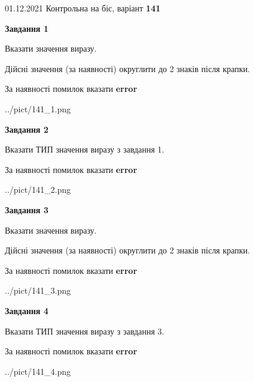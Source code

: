\documentclass[11pt, ukrainian]{article}
\begin{document}
{01.12.2021 Контрольна на біс, варіант  \No \textbf { 141 }\par}
{
\begin {large}
{\begin {center}\textbf{Завдання 1}\end {center}}\par
Вказати значення виразу. \par
Дійсні значення (за наявності) округлити до 2 знаків після крапки. \par
За наявності помилок вказати \textbf{error}

\begin{center}
	{../pict/141_1.png}
\end{center}
\newpage

{\begin {center}\textbf{Завдання 2}\end {center}}\par
Вказати ТИП значення виразу з завдання 1. \par
За наявності помилок вказати \textbf{error}

\begin{center}
	{../pict/141_2.png}
\end{center}
\newpage

{\begin {center}\textbf{Завдання 3}\end {center}}\par
Вказати значення виразу. \par
Дійсні значення (за наявності) округлити до 2 знаків після крапки. \par
За наявності помилок вказати \textbf{error}

\begin{center}
	{../pict/141_3.png}
\end{center}
\newpage

{\begin {center}\textbf{Завдання 4}\end {center}}\par
Вказати ТИП значення виразу з завдання 3. \par
За наявності помилок вказати \textbf{error}

\begin{center}
	{../pict/141_4.png}
\end{center}
\newpage


\end{large}}
\end{document}
